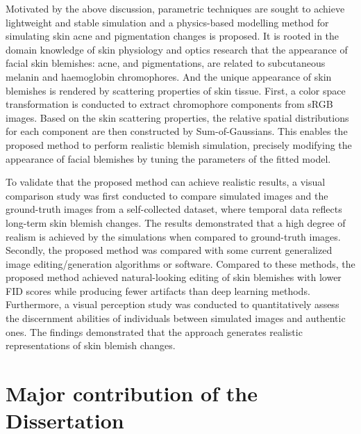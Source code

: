 \begin{spacing}{1.5}
Motivated by the above discussion, parametric techniques are sought to achieve lightweight and stable simulation and a physics-based modelling method for simulating skin acne and pigmentation changes is proposed. It is rooted in the domain knowledge of skin physiology and optics research that the appearance of facial skin blemishes: acne, and pigmentations, are related to subcutaneous melanin and haemoglobin chromophores\cite{tsumuraImagebasedSkinColor}. And the unique appearance of skin blemishes is rendered by scattering properties of skin tissue\cite{10.5555/2383894.2383946}. First, a color space transformation is conducted to extract chromophore components from sRGB images. Based on the skin scattering properties, the relative spatial distributions for each component are then constructed by Sum-of-Gaussians. This enables the proposed method to perform realistic blemish simulation, precisely modifying the appearance of facial blemishes by tuning the parameters of the fitted model.

To validate that the proposed method can achieve realistic results, a visual comparison study was first conducted to compare simulated images and the ground-truth images from a self-collected dataset, where temporal data reflects long-term skin blemish changes. The results demonstrated that a high degree of realism is achieved by the simulations when compared to ground-truth images. Secondly, the proposed method was compared with some current generalized image editing/generation algorithms or software. Compared to these methods, the proposed method achieved natural-looking editing of skin blemishes with lower FID scores while producing fewer artifacts than deep learning methods. Furthermore, a visual perception study was conducted to quantitatively assess the discernment abilities of individuals between simulated images and authentic ones. The findings demonstrated that the approach generates realistic representations of skin blemish changes.


\section{Major contribution of the Dissertation}


\end{spacing}

